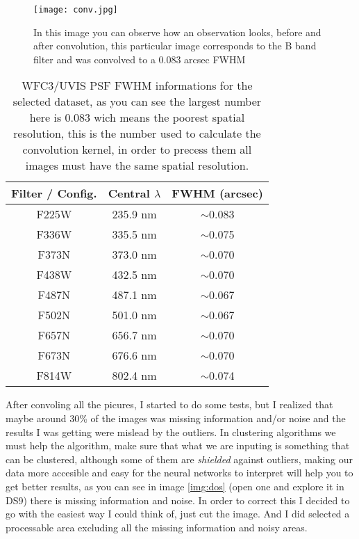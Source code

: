 \documentclass[11pt,fleqn]{book} %
\begin{document}
\begin{figure}[h]
	\centering
    \texttt{[image: conv.jpg]}
    \caption{In this image you can observe how an observation looks, before and after convolution, this particular image corresponds to the B band filter and was convolved to a 0.083 arcsec FWHM}
    \label{img:conv}
\end{figure}

\begin{table}[h]
  \centering
    \begin{tabular}{ c c c }
    \hline\hline
    
    Filter / Config. & Central $\lambda$ & FWHM (arcsec)\\
    \hline
    
    F225W & 235.9 nm & $\sim$0.083\\
    
    F336W & 335.5 nm & $\sim$0.075\\
    
    F373N & 373.0 nm & $\sim$0.070\\
    
    F438W & 432.5 nm & $\sim$0.070\\
    
    F487N & 487.1 nm & $\sim$0.067\\
    
    F502N & 501.0 nm & $\sim$0.067\\
    
    F657N & 656.7 nm & $\sim$0.070\\
    
    F673N & 676.6 nm & $\sim$0.070\\
    
    F814W & 802.4 nm & $\sim$0.074\\
    
    \hline
  \end{tabular}
  \caption{WFC3/UVIS PSF FWHM informations for the selected dataset, as you can see the largest number here is 0.083 wich means the poorest spatial resolution, this is the number used to calculate the convolution kernel, in order to precess them all images must have the same spatial resolution.}
  \label{tab:dos}
\end{table}

After convoling all the picures, I started to do some tests, but I realized that maybe around 30\% of the images was missing information and/or noise and the results I was getting were mislead by the outliers. In clustering algorithms we must help the algorithm, make sure that what we are inputing is something that can be clustered, although some of them are \emph{shielded} against outliers, making our data more accesible and easy for the neural networks to interpret will help you to get better results, as you can see in image \ref{img:dos} (open one and explore it in DS9) there is missing information and noise. In order to correct this I decided to go with the easiest way I could think of, just cut the image. And I did selected a processable area excluding all the missing information and noisy areas.
\end{document}
